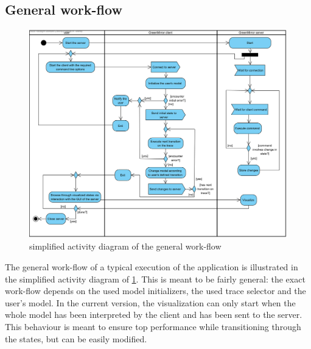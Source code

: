 \subsection{General work-flow}\label{sec:design;sub:generalwf}
\begin{figure}[h]
  \centering
  \includegraphics[width=1.0\textwidth]{diagrams/AD_generalworkflow}
  \caption{simplified activity diagram of the general work-flow}\label{fig:ad_generalworkflow}
\end{figure}
The general work-flow of a typical execution of the application is illustrated in the simplified activity diagram of \cref{fig:ad_generalworkflow}. This is meant to be fairly general: the exact work-flow depends on the used model initializers, the used trace selector and the user's model. In the current version, the visualization can only start when the whole model has been interpreted by the client and has been sent to the server. This behaviour is meant to ensure top performance while transitioning through the states, but can be easily modified.
